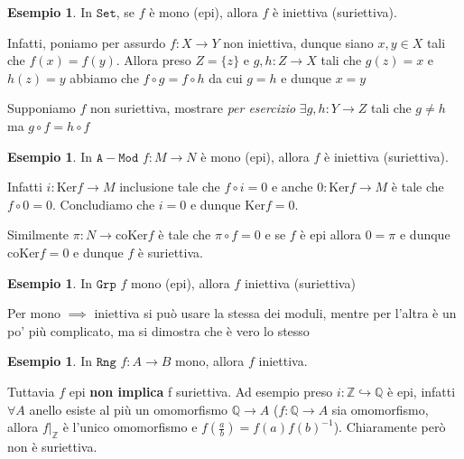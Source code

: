 \documentclass[notitlepage]{report}
\newcounter{theo}[section]\setcounter{theo}{0}
\newcounter{excounter}[section]\setcounter{excounter}{0}
\numberwithin{equation}{section}
\theoremstyle{plain}
\theoremstyle{definition}
\newtheorem{example}[excounter]{Esempio}
\theoremstyle{remark}
\begin{document}
\begin{example}{}
    In \(\mathtt{Set}\), se \(f\) è mono (epi), allora \(f\) è iniettiva
    (suriettiva).

    Infatti, poniamo per assurdo \(f : X \to Y\) non iniettiva, dunque siano \(x, y \in X\) tali che \(f{(x)} = f{(y)}\). Allora preso \(Z = \{z\} \) e \(g, h : Z\to X\) tali che \(g
    {(z)} = x\) e \(h{(z)} = y\) abbiamo che \(f \circ g = f \circ h\) da cui \(g = h\) e dunque \(x = y\) 

    Supponiamo \(f\) non suriettiva, mostrare \emph{per esercizio} \(\exists g, h : Y \to Z\) tali che
    \(g \neq h\) ma \(g \circ f = h \circ f\) 
\end{example}

\begin{example}{}
    In \(\mathtt{A-Mod}\) \(f : M \to N\) è mono (epi), allora \(f\) è iniettiva (suriettiva).

    Infatti \(i : \mathrm{Ker}f \to M\) inclusione tale che \(f \circ i = 0\) e
    anche \(0 : \mathrm{Ker}f \to M\) è tale che \(f \circ 0 = 0\). Concludiamo
    che \(i = 0\) e dunque \(\mathrm{Ker}f = 0\).

    Similmente \(\pi : N \to \mathrm{coKer}f\) è tale che \(\pi \circ f = 0\) e
    se \(f\) è epi allora \(0 = \pi \) e dunque \(\mathrm{coKer} f= 0\) e dunque
    \(f\) è suriettiva.
\end{example}

\begin{example}{}
    In \(\mathtt{Grp}\) \(f\) mono (epi), allora \(f\) iniettiva (suriettiva)

    Per mono \(\implies \) iniettiva si può usare la stessa dei moduli, mentre
    per l'altra è un po' più complicato, ma si dimostra che è vero lo stesso
\end{example}

\begin{example}{}
    In \(\mathtt{Rng}\) \(f : A\to B\) mono, allora \(f\) iniettiva. %

    Tuttavia \(f\) epi \textbf{non implica} f suriettiva. Ad esempio preso \(i :
    \mathbb{Z} \hookrightarrow \mathbb{Q}\) è epi, infatti \(\forall A\) anello
    esiste al più un omomorfismo \(\mathbb{Q} \to A\) (\(f : \mathbb{Q}\to A\)
    sia omomorfismo, allora \(f|_{\mathbb{Z}} \) è l'unico omomorfismo e \(f{(\frac{a}{b})} = f{(a)}f{(b)}^{-1}\)). Chiaramente però non è suriettiva.
\end{example}
\end{document}

